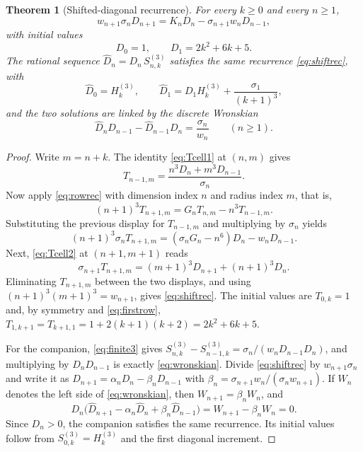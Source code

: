 \documentclass[11pt,letterpaper]{article}
\numberwithin{equation}{section}
\newtheorem{theorem}{Theorem}[section]
\theoremstyle{definition}
\newcommand{\Hh}[2]{H_{#1}^{(#2)}}
\begin{document}
\begin{theorem}[Shifted-diagonal recurrence]\label{thm:shiftrec}
For every $k\geq0$ and every $n\geq1$,
\begin{equation}\label{eq:shiftrec}
 w_{n+1}\sigma_n D_{n+1}=K_nD_n-\sigma_{n+1}w_nD_{n-1},
\end{equation}
with initial values
\begin{equation}\label{eq:Dinit}
 D_0=1,\qquad D_1=2k^2+6k+5.
\end{equation}
The rational sequence $\widehat D_n=D_n\,S^{(3)}_{n,k}$ satisfies the
same recurrence \eqref{eq:shiftrec}, with
\begin{equation}\label{eq:Dhatinit}
 \widehat D_0=\Hh{k}{3},\qquad
 \widehat D_1=D_1\Hh{k}{3}+\frac{\sigma_1}{(k+1)^3},
\end{equation}
and the two solutions are linked by the discrete Wronskian
\begin{equation}\label{eq:wronskian}
 \widehat D_nD_{n-1}-\widehat D_{n-1}D_n=\frac{\sigma_n}{w_n}
 \qquad(n\geq1).
\end{equation}
\end{theorem}
\begin{proof}
Write $m=n+k$. The identity \eqref{eq:Tcell1} at $(n,m)$ gives
\[
 T_{n-1,m}=\frac{n^3D_n+m^3D_{n-1}}{\sigma_n}.
\]
Now apply \eqref{eq:rowrec} with dimension index $n$ and radius index
$m$, that is,
\[
 (n+1)^3T_{n+1,m}=G_nT_{n,m}-n^3T_{n-1,m}.
\]
Substituting the previous display for $T_{n-1,m}$ and multiplying by
$\sigma_n$ yields
\[
 (n+1)^3\sigma_nT_{n+1,m}=(\sigma_nG_n-n^6)D_n-w_nD_{n-1}.
\]
Next, \eqref{eq:Tcell2} at $(n+1,m+1)$ reads
\[
 \sigma_{n+1}T_{n+1,m}=(m+1)^3D_{n+1}+(n+1)^3D_n.
\]
Eliminating $T_{n+1,m}$ between the two displays, and using
$(n+1)^3(m+1)^3=w_{n+1}$, gives \eqref{eq:shiftrec}. The initial values
are $T_{0,k}=1$ and, by symmetry and \eqref{eq:firstrow},
$T_{1,k+1}=T_{k+1,1}=1+2(k+1)(k+2)=2k^2+6k+5$.

For the companion, \eqref{eq:finite3} gives
$S^{(3)}_{n,k}-S^{(3)}_{n-1,k}=\sigma_n/(w_nD_{n-1}D_n)$, and
multiplying by $D_nD_{n-1}$ is exactly \eqref{eq:wronskian}.
Divide \eqref{eq:shiftrec} by $w_{n+1}\sigma_n$ and write it as
$D_{n+1}=\alpha_nD_n-\beta_nD_{n-1}$ with
$\beta_n=\sigma_{n+1}w_n/(\sigma_nw_{n+1})$. If $W_n$ denotes the left
side of \eqref{eq:wronskian}, then $W_{n+1}=\beta_nW_n$, and
\[
 D_n\bigl(\widehat D_{n+1}-\alpha_n\widehat D_n
 +\beta_n\widehat D_{n-1}\bigr)=W_{n+1}-\beta_nW_n=0 .
\]
Since $D_n>0$, the companion satisfies the same recurrence. Its initial
values follow from $S^{(3)}_{0,k}=\Hh{k}{3}$ and the first diagonal
increment.
\end{proof}
\end{document}
